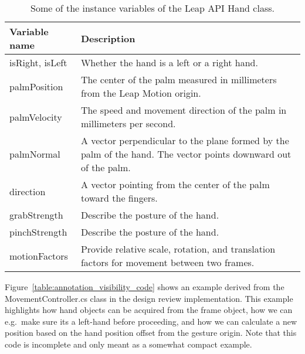 \begin{table}[]
\centering
\label{tab:hand_variables}
\begin{tabular}{p{2.5cm}| p{8cm}}
	\textbf{Variable name} &  \textbf{Description} \\ \hline
	isRight, isLeft & Whether the hand is a left or a right hand. \\ \hline
	palmPosition    & The center of the palm measured in millimeters from the Leap Motion origin. \\ \hline
	palmVelocity    & The speed and movement direction of the palm in millimeters per second.  \\ \hline
	palmNormal      & A vector perpendicular to the plane formed by the palm of the hand. The vector points downward out of the palm.  \\ \hline
	direction       & A vector pointing from the center of the palm toward the fingers.  \\ \hline
	grabStrength    & Describe the posture of the hand.  \\ \hline
	pinchStrength   & Describe the posture of the hand.  \\ \hline
	motionFactors   & Provide relative scale, rotation, and translation factors for movement between two frames. 
\end{tabular}
\caption{Some of the instance variables of the Leap API Hand class.}
\end{table}

Figure~\vref{table:annotation_visibility_code} shows an example derived from the MovementController.cs class in the design review implementation. 
This example highlights how hand objects can be acquired from the frame object, how we can e.g.~make sure its a left-hand
before proceeding, and how we can calculate a new position based on the hand position offset from the gesture origin.
Note that this code is incomplete and only meant as a somewhat compact example.


